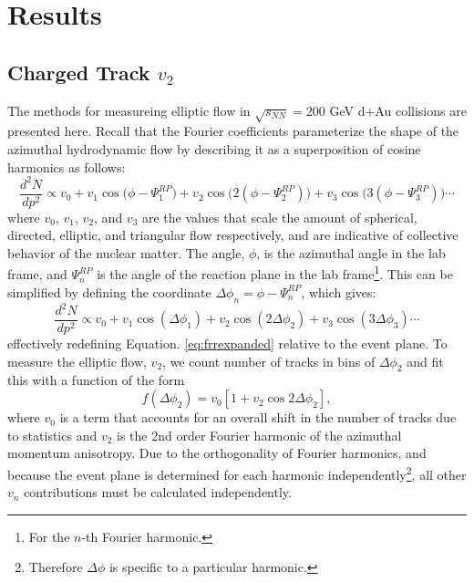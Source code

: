 
\chapter{Results} %
\section{Charged Track $v_{2}$}
\label{sect:alltracks}
The methods for measureing elliptic flow in $\sqrt{s_{NN}}=200$ GeV d+Au collisions are presented here. Recall that the Fourier coefficients parameterize the shape of the azimuthal hydrodynamic flow by describing it as a superposition of cosine harmonics as follows:
\begin{equation} \label{eq:frrexpanded}
\frac{d^{2}N}{dp^{2}} \propto v_0 + v_1 \cos\big(\phi - \Psi^{RP}_1\big) + v_2 \cos\big(2(\phi - \Psi^{RP}_2)\big) + v_3 \cos\big(3(\phi - \Psi^{RP}_3)\big) \cdots
\end{equation}
where $v_0$, $v_1$, $v_2$, and $v_3$ are the values that scale the amount of spherical, directed, elliptic, and triangular flow respectively, and are indicative of collective behavior of the nuclear matter. The angle, $\phi$, is the azimuthal angle in the lab frame, and $\Psi^{RP}_n$ is the angle of the reaction plane in the lab frame\footnote{For the $n$-th Fourier harmonic.}. This can be simplified by defining the coordinate $\Delta \phi_n = \phi - \Psi^{RP}_n$, which gives:
\begin{equation} 
\frac{d^{2}N}{dp^{2}} \propto v_0 + v_1 \cos(\Delta \phi _1) + v_2 \cos(2\Delta \phi _2) + v_3 \cos(3\Delta \phi _3) \cdots
\end{equation}
effectively redefining Equation. \ref{eq:frrexpanded} relative to the event plane. To measure the elliptic flow, $v_2$, we count number of tracks in bins of $\Delta \phi_2$ and fit this with a function of the form
\begin{equation}
\label{v2fitfn}
f(\Delta \phi_2) = v_0 [1 + v_2 \cos 2 \Delta \phi_2],
\end{equation}
where $v_0$ is a term that accounts for an overall shift in the number of tracks due to statistics and $v_2$ is the 2nd order Fourier harmonic of the azimuthal momentum anisotropy. Due to the orthogonality of Fourier harmonics, and because the event plane is determined for each harmonic independently\footnote{Therefore $\Delta \phi$ is specific to a particular harmonic.}, all other $v_n$ contributions must be calculated independently.


